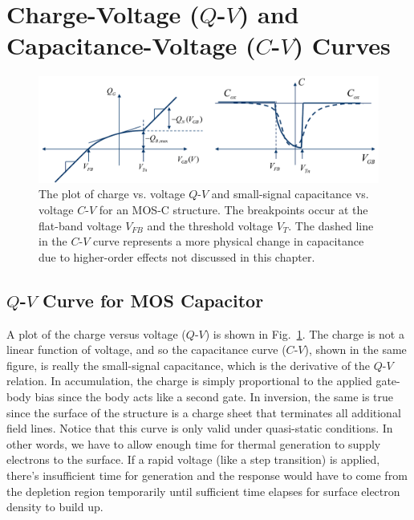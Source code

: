 \section{Charge-Voltage ($Q$-$V$) and Capacitance-Voltage ($C$-$V$) Curves}
\begin{figure}[tbh]
\begin{center}
\includegraphics[width=\columnwidth]{mos_qv_cv}
\end{center}
\caption{The plot of charge vs. voltage $Q$-$V$ and small-signal capacitance vs. voltage $C$-$V$ for an MOS-C structure.  The breakpoints occur at the flat-band voltage $V_{FB}$ and the threshold voltage $V_T$.  The dashed line in the $C$-$V$ curve represents a more physical change in capacitance due to higher-order effects not discussed in this chapter.}
\label{fig:mos_qv_cv}
\end{figure}
\subsection{$Q$-$V$ Curve for MOS Capacitor}
A plot of the charge versus voltage ($Q$-$V$) is shown in Fig.~\ref{fig:mos_qv_cv}.  The charge is not a linear function of voltage, and so the capacitance curve ($C$-$V$), shown in the same figure, is really the small-signal capacitance, which is the derivative of the $Q$-$V$ relation.   In accumulation, the charge is simply proportional to the applied gate-body bias since the body acts like a second gate.  In inversion, the same is true since the surface of the structure is a charge sheet that terminates all additional field lines.  Notice that this curve is only valid under quasi-static conditions.  In other words, we have to allow enough time for thermal generation to supply electrons to the surface.  If a rapid voltage (like a step transition) is applied, there's insufficient time for generation and the response would have to come from the depletion region temporarily until sufficient time elapses for surface electron density to build up.  

